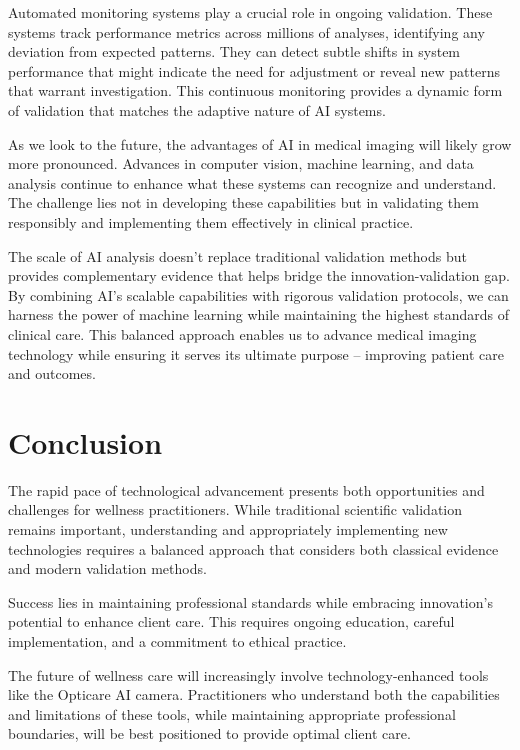 \documentclass[
  Letterpaper,
]{scrbook}
\begin{document}
Automated monitoring systems play a crucial role in ongoing validation.
These systems track performance metrics across millions of analyses,
identifying any deviation from expected patterns. They can detect subtle
shifts in system performance that might indicate the need for adjustment
or reveal new patterns that warrant investigation. This continuous
monitoring provides a dynamic form of validation that matches the
adaptive nature of AI systems.

As we look to the future, the advantages of AI in medical imaging will
likely grow more pronounced. Advances in computer vision, machine
learning, and data analysis continue to enhance what these systems can
recognize and understand. The challenge lies not in developing these
capabilities but in validating them responsibly and implementing them
effectively in clinical practice.

The scale of AI analysis doesn't replace traditional validation methods
but provides complementary evidence that helps bridge the
innovation-validation gap. By combining AI's scalable capabilities with
rigorous validation protocols, we can harness the power of machine
learning while maintaining the highest standards of clinical care. This
balanced approach enables us to advance medical imaging technology while
ensuring it serves its ultimate purpose -- improving patient care and
outcomes.

\section{Conclusion}\label{conclusion-2}

The rapid pace of technological advancement presents both opportunities
and challenges for wellness practitioners. While traditional scientific
validation remains important, understanding and appropriately
implementing new technologies requires a balanced approach that
considers both classical evidence and modern validation methods.

Success lies in maintaining professional standards while embracing
innovation's potential to enhance client care. This requires ongoing
education, careful implementation, and a commitment to ethical practice.

The future of wellness care will increasingly involve
technology-enhanced tools like the Opticare AI camera. Practitioners who
understand both the capabilities and limitations of these tools, while
maintaining appropriate professional boundaries, will be best positioned
to provide optimal client care.
\end{document}
